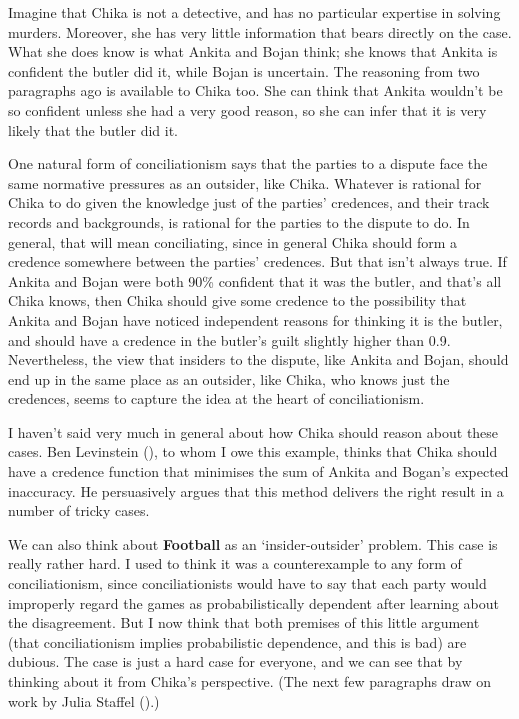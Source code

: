 \documentclass[
  10pt,
  letterpaper,
  twoside]{scrbook}
\begin{document}
Imagine that {Chika} is not a detective, and has no particular expertise
in solving murders. Moreover, she has very little information that bears
directly on the case. What she does know is what {Ankita} and {Bojan}
think; she knows that {Ankita} is confident the butler did it, while
{Bojan} is uncertain. The reasoning from two paragraphs ago is available
to {Chika} too. She can think that {Ankita} wouldn't be so confident
unless she had a very good reason, so she can infer that it is very
likely that the butler did it.

One natural form of conciliationism says that the parties to a dispute
face the same normative pressures as an outsider, like {Chika}. Whatever
is rational for {Chika} to do given the knowledge just of the parties'
credences, and their track records and backgrounds, is rational for the
parties to the dispute to do. In general, that will mean conciliating,
since in general {Chika} should form a credence somewhere between the
parties' credences. But that isn't always true. If {Ankita} and {Bojan}
were both 90\% confident that it was the butler, and that's all {Chika}
knows, then {Chika} should give some credence to the possibility that
{Ankita} and {Bojan} have noticed independent reasons for thinking it is
the butler, and should have a credence in the butler's guilt slightly
higher than 0.9. Nevertheless, the view that insiders to the dispute,
like {Ankita} and {Bojan}, should end up in the same place as an
outsider, like {Chika}, who knows just the credences, seems to capture
the idea at the heart of conciliationism.

I haven't said very much in general about how {Chika} should reason
about these cases. Ben Levinstein (),
to whom I owe this example, thinks that {Chika} should have a credence
function that minimises the sum of {Ankita} and Bogan's expected
inaccuracy. He persuasively argues that this method delivers the right
result in a number of tricky cases.

We can also think about \textbf{Football} as an `insider-outsider'
problem. This case is really rather hard. I used to think it was a
counterexample to any form of conciliationism, since conciliationists
would have to say that each party would improperly regard the games as
probabilistically dependent after learning about the disagreement. But I
now think that both premises of this little argument (that
conciliationism implies probabilistic dependence, and this is bad) are
dubious. The case is just a hard case for everyone, and we can see that
by thinking about it from {Chika}'s perspective. (The next few
paragraphs draw on work by Julia Staffel
().)
\end{document}
